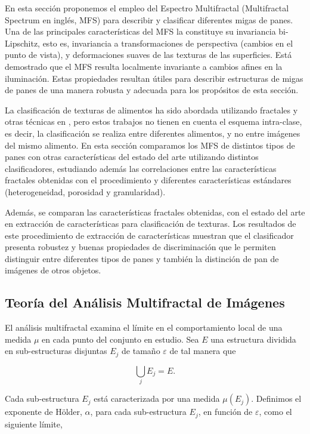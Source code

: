 En esta sección proponemos el empleo del Espectro Multifractal (Multifractal Spectrum en inglés, \acrshort{MFS}) \cite{Xu2009} para describir y clasificar diferentes migas de panes.
Una de las principales características del MFS la constituye su invariancia bi-Lipschitz, esto es, invariancia a transformaciones de perspectiva (cambios en el punto de vista), y deformaciones suaves de las texturas de las superficies.
Está demostrado que el MFS resulta localmente invariante a cambios afines en la iluminación.
Estas propiedades resultan útiles para describir estructuras de migas de panes de una manera robusta y adecuada para los propósitos de esta sección.

La clasificación de texturas de alimentos ha sido abordada utilizando fractales y otras técnicas en \cite{Zong2010,Bosch2011}, pero estos trabajos no tienen en cuenta el esquema intra-clase, es decir, la clasificación se realiza entre diferentes alimentos, y no entre imágenes del mismo alimento.
En esta sección comparamos los MFS de distintos tipos de panes con otras características del estado del arte utilizando distintos clasificadores, estudiando además las correlaciones entre las características fractales obtenidas con el procedimiento y diferentes características estándares (heterogeneidad, porosidad y granularidad).

Además, se comparan las características fractales obtenidas, con el estado del arte en extracción de características para clasificación de texturas.
Los resultados de este procedimiento de extracción de características muestran que el clasificador presenta robustez y buenas propiedades de discriminación que le permiten distinguir entre diferentes tipos de panes y también la distinción de pan de imágenes de otros objetos.

\subsection{Teoría del Análisis Multifractal de Imágenes}

El análisis multifractal examina el límite en el comportamiento local de una medida $\mu$ en cada punto del conjunto en estudio.
Sea $E$ una estructura dividida en sub-estructuras disjuntas $E_{j}$ de tamaño $\varepsilon$ de tal manera que

\begin{equation}
\displaystyle\bigcup_{j}E_{j} = E.
\end{equation}

Cada sub-estructura $E_{j}$ está caracterizada por una medida $\mu(E_{j})$.
Definimos el exponente de H\"older, $\alpha$, para cada sub-estructura $E_{j}$, en función de $\varepsilon$, como el siguiente límite,



